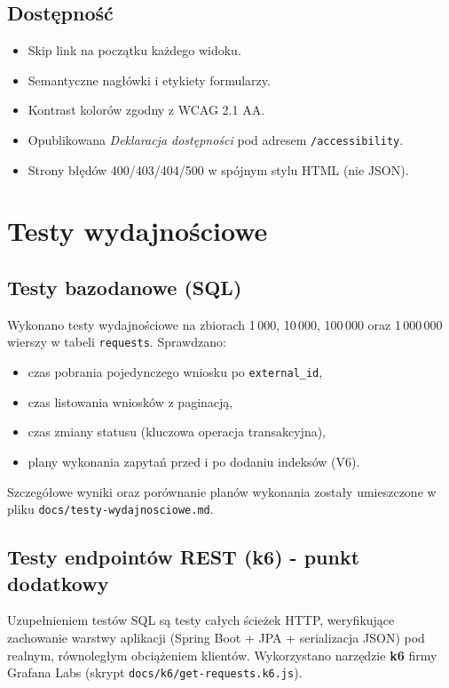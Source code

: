 \documentclass[12pt,a4paper]{article}
\begin{document}
\subsection{Dostępność}
\begin{itemize}[leftmargin=*]
  \item Skip link na początku każdego widoku.
  \item Semantyczne nagłówki i etykiety formularzy.
  \item Kontrast kolorów zgodny z WCAG 2.1 AA.
  \item Opublikowana \emph{Deklaracja dostępności} pod adresem \texttt{/accessibility}.
  \item Strony błędów 400/403/404/500 w spójnym stylu HTML (nie JSON).
\end{itemize}

\section{Testy wydajnościowe}
\label{sec:wydajnosc}

\subsection{Testy bazodanowe (SQL)}
Wykonano testy wydajnościowe na zbiorach 1\,000, 10\,000, 100\,000 oraz
1\,000\,000 wierszy w tabeli \texttt{requests}. Sprawdzano:
\begin{itemize}[leftmargin=*]
  \item czas pobrania pojedynczego wniosku po \texttt{external\_id},
  \item czas listowania wniosków z paginacją,
  \item czas zmiany statusu (kluczowa operacja transakcyjna),
  \item plany wykonania zapytań przed i po dodaniu indeksów (V6).
\end{itemize}

Szczegółowe wyniki oraz porównanie planów wykonania zostały umieszczone w pliku
\texttt{docs/testy-wydajnosciowe.md}.

\subsection{Testy endpointów REST (k6) - punkt dodatkowy}
Uzupełnieniem testów SQL są testy całych ścieżek HTTP, weryfikujące zachowanie
warstwy aplikacji (Spring Boot + JPA + serializacja JSON) pod realnym,
równoległym obciążeniem klientów. Wykorzystano narzędzie \textbf{k6} firmy
Grafana Labs (skrypt \texttt{docs/k6/get-requests.k6.js}).
\end{document}
